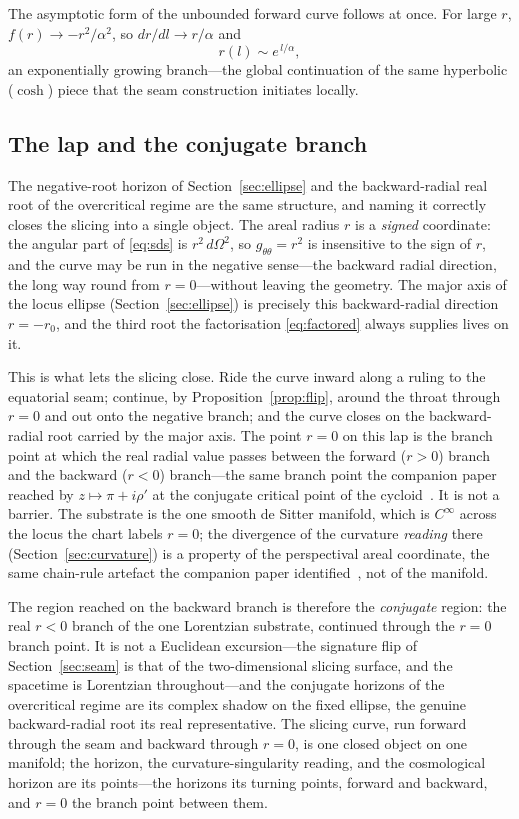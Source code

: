 \documentclass[11pt,a4paper]{article}
\theoremstyle{definition}
\begin{document}
The asymptotic form of the unbounded forward curve follows at once. For large $r$, $f(r)\to-r^{2}/\alpha^{2}$, so $dr/dl\to r/\alpha$ and
\begin{equation}\label{eq:overcrit-asymp}
  r(l)\sim e^{\,l/\alpha},
\end{equation}
an exponentially growing branch---the global continuation of the same hyperbolic ($\cosh$) piece that the seam construction initiates locally.

\subsection{The lap and the conjugate branch}\label{sec:lap}

The negative-root horizon of Section~\ref{sec:ellipse} and the backward-radial real root of the overcritical regime are the same structure, and naming it correctly closes the slicing into a single object. The areal radius $r$ is a \emph{signed} coordinate: the angular part of \eqref{eq:sds} is $r^{2}\,d\Omega^{2}$, so $g_{\theta\theta}=r^{2}$ is insensitive to the sign of $r$, and the curve may be run in the negative sense---the backward radial direction, the long way round from $r=0$---without leaving the geometry. The major axis of the locus ellipse (Section~\ref{sec:ellipse}) is precisely this backward-radial direction $r=-r_{0}$, and the third root the factorisation \eqref{eq:factored} always supplies lives on it.

This is what lets the slicing close. Ride the curve inward along a ruling to the equatorial seam; continue, by Proposition~\ref{prop:flip}, around the throat through $r=0$ and out onto the negative branch; and the curve closes on the backward-radial root carried by the major axis. The point $r=0$ on this lap is the branch point at which the real radial value passes between the forward ($r>0$) branch and the backward ($r<0$) branch---the same branch point the companion paper reached by $z\mapsto\pi+i\rho'$ at the conjugate critical point of the cycloid~\cite{JanzenCircle}. It is not a barrier. The substrate is the one smooth de Sitter manifold, which is $C^{\infty}$ across the locus the chart labels $r=0$; the divergence of the curvature \emph{reading} there (Section~\ref{sec:curvature}) is a property of the perspectival areal coordinate, the same chain-rule artefact the companion paper identified~\cite{JanzenCircle}, not of the manifold.

The region reached on the backward branch is therefore the \emph{conjugate} region: the real $r<0$ branch of the one Lorentzian substrate, continued through the $r=0$ branch point. It is not a Euclidean excursion---the signature flip of Section~\ref{sec:seam} is that of the two-dimensional slicing surface, and the spacetime is Lorentzian throughout---and the conjugate horizons of the overcritical regime are its complex shadow on the fixed ellipse, the genuine backward-radial root its real representative. The slicing curve, run forward through the seam and backward through $r=0$, is one closed object on one manifold; the horizon, the curvature-singularity reading, and the cosmological horizon are its points---the horizons its turning points, forward and backward, and $r=0$ the branch point between them.
\end{document}
